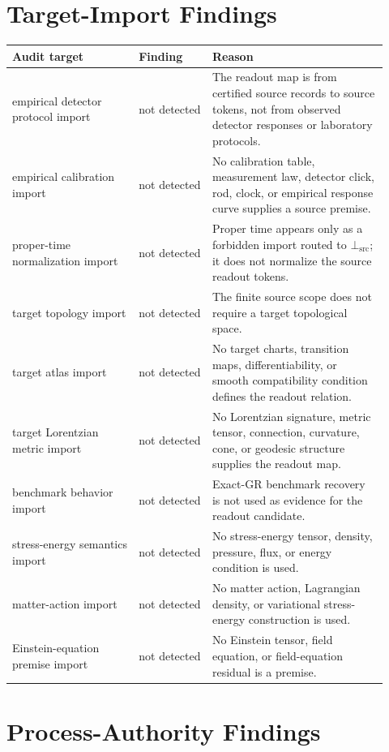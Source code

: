 \documentclass[11pt]{article}
\newcommand{\BottomSrc}{\bot_{\mathrm{src}}}
\begin{document}
\section{Target-Import Findings}

\begin{longtable}{p{0.31\linewidth}p{0.18\linewidth}p{0.43\linewidth}}
\toprule
Audit target & Finding & Reason \\
\midrule
empirical detector protocol import & not detected & The readout map is from certified source records to source tokens, not from observed detector responses or laboratory protocols. \\
empirical calibration import & not detected & No calibration table, measurement law, detector click, rod, clock, or empirical response curve supplies a source premise. \\
proper-time normalization import & not detected & Proper time appears only as a forbidden import routed to \(\BottomSrc\); it does not normalize the source readout tokens. \\
target topology import & not detected & The finite source scope does not require a target topological space. \\
target atlas import & not detected & No target charts, transition maps, differentiability, or smooth compatibility condition defines the readout relation. \\
target Lorentzian metric import & not detected & No Lorentzian signature, metric tensor, connection, curvature, cone, or geodesic structure supplies the readout map. \\
benchmark behavior import & not detected & Exact-GR benchmark recovery is not used as evidence for the readout candidate. \\
stress-energy semantics import & not detected & No stress-energy tensor, density, pressure, flux, or energy condition is used. \\
matter-action import & not detected & No matter action, Lagrangian density, or variational stress-energy construction is used. \\
Einstein-equation premise import & not detected & No Einstein tensor, field equation, or field-equation residual is a premise. \\
\bottomrule
\end{longtable}

\section{Process-Authority Findings}
\end{document}
